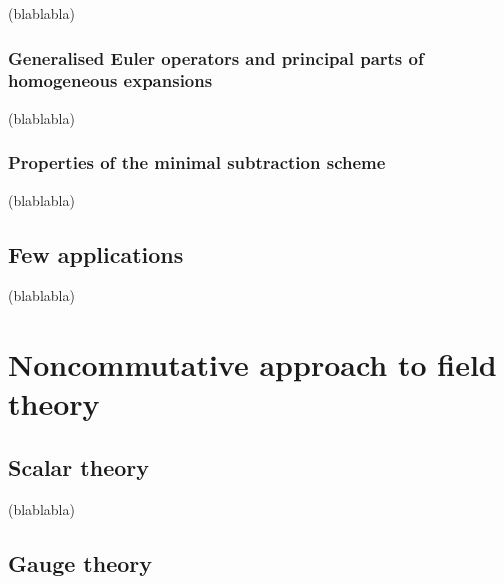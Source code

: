 \documentclass[11pt]{book}
\begin{document}
(blablabla)

\section{Generalised Euler operators and principal parts of homogeneous expansions}

(blablabla)

\section{Properties of the minimal subtraction scheme}

(blablabla)

\chapter{Few applications}

(blablabla)

\part{Noncommutative approach to field theory} \label{chp:ncft}

\chapter{Scalar theory}

(blablabla)

\chapter{Gauge theory}
\end{document}
